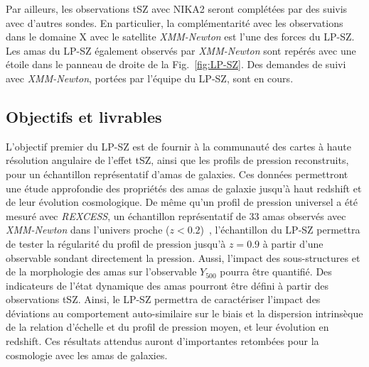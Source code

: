 Par ailleurs, les observations tSZ avec NIKA2 seront complétées par
des suivis avec d'autres sondes. En particulier, la complémentarité
avec les observations dans le domaine X avec le satellite
\emph{XMM-Newton} est l'une des forces du LP-SZ. Les amas du LP-SZ
également observés par \emph{XMM-Newton} sont repérés avec une étoile
dans le panneau de droite de la Fig.~\ref{fig:LP-SZ}. Des demandes de
suivi avec \emph{XMM-Newton}, portées par l'équipe du LP-SZ, sont en
cours.   

\subsection{Objectifs et livrables}

L'objectif premier du LP-SZ est de fournir à la communauté des cartes
à haute résolution angulaire de l'effet tSZ, ainsi que les profils de
pression reconstruits, pour un échantillon représentatif d'amas de
galaxies. Ces données permettront une étude approfondie des propriétés
des amas de galaxie jusqu'à haut redshift et de leur évolution
cosmologique. De même qu'un profil de pression universel a été mesuré
avec \emph{REXCESS}, un échantillon représentatif de 33 amas observés
avec \emph{XMM-Newton} dans l'univers proche
($z<0.2$)~\citep{Arnaud2010}, l'échantillon du LP-SZ permettra de
tester la régularité du profil de pression jusqu'à $z=0.9$ à partir
d'une observable sondant directement la pression. Aussi, l'impact des
sous-structures et de la morphologie des amas sur l'observable $Y_{500}$
pourra être quantifié. Des indicateurs de l'état dynamique des amas
pourront être défini à partir des observations tSZ. Ainsi, le LP-SZ
permettra de caractériser l'impact des déviations au
comportement auto-similaire sur le biais et la dispersion intrinsèque
de la relation d'échelle et du profil de pression moyen, et leur
évolution en redshift. Ces résultats attendus auront d'importantes retombées
pour la cosmologie avec les amas de galaxies.

